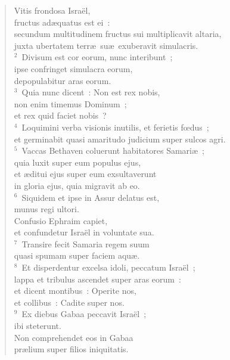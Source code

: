\begin{flushleft}\begin{verse}\vspace{-19pt}\hspace{6pt}Vitis frondosa Isra\"el,\\\hspace{6pt} fructus ad\ae quatus est ei~:\\ secundum multitudinem fructus sui multiplicavit altaria,\\ juxta ubertatem terr\ae\ su\ae\ exuberavit simulacris.\\
${}^{2}$~Divisum est cor eorum, nunc interibunt~;\\ ipse confringet simulacra eorum,\\ depopulabitur aras eorum.\\
${}^{3}$~Quia nunc dicent~: Non est rex nobis,\\ non enim timemus Dominum~;\\ et rex quid faciet nobis~?\\
${}^{4}$~Loquimini verba visionis inutilis, et ferietis fœdus~;\\ et germinabit quasi amaritudo judicium super sulcos agri.\\
${}^{5}$~Vaccas Bethaven coluerunt habitatores Samari\ae~;\\ quia luxit super eum populus ejus,\\ et \ae ditui ejus super eum exsultaverunt\\ in gloria ejus, quia migravit ab eo.\\
${}^{6}$~Siquidem et ipse in Assur delatus est,\\ munus regi ultori.\\ Confusio Ephraim capiet,\\ et confundetur Isra\"el in voluntate sua.\\
${}^{7}$~Transire fecit Samaria regem suum\\ quasi spumam super faciem aqu\ae .\\
${}^{8}$~Et disperdentur excelsa idoli, peccatum Isra\"el~;\\ lappa et tribulus ascendet super aras eorum~:\\ et dicent montibus~: Operite nos,\\ et collibus~: Cadite super nos.\\
${}^{9}$~Ex diebus Gabaa peccavit Isra\"el~;\\ ibi steterunt.\\ Non comprehendet eos in Gabaa\\ pr\ae lium super filios iniquitatis.\\

\end{verse}
\end{flushleft}
